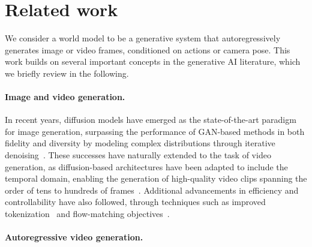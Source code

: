 \section{Related work}
\label{sec:related}

We consider a world model to be a generative system that autoregressively generates image or video frames, conditioned on actions or camera pose. This work builds on several important concepts in the generative AI literature, which we briefly review in the following.  

\paragraph{Image and video generation.}

In recent years, diffusion models have emerged as the state-of-the-art paradigm for image generation, surpassing the performance of GAN-based methods in both fidelity and diversity by modeling complex distributions through iterative denoising~\cite{Lee2018StochasticAV, Mathieu2015DeepMV, Tulyakov2017MoCoGANDM, Vondrick2017GeneratingTF, Dhariwal2021DiffusionMB}. These successes have naturally extended to the task of video generation, as diffusion-based architectures have been adapted to include the temporal domain, enabling the generation of high-quality video clips spanning the order of tens to hundreds of frames~\cite{Zheng2024OpenSoraDE,Lin2024OpenSoraPO,Yang2024CogVideoXTD,Qiu2025SkyReelsA1EP,Fei2025SkyReelsA2CA,Chen2025SkyReelsV2IF,Blattmann2023StableVD}. Additional advancements in efficiency and controllability have also followed, through techniques such as improved tokenization~\cite{Tang2024VidTokAV,Xie2024SANAEH} and flow-matching objectives~\cite{Lipman2022FlowMF,Jin2024PyramidalFM}.

\paragraph{Autoregressive video generation.}

